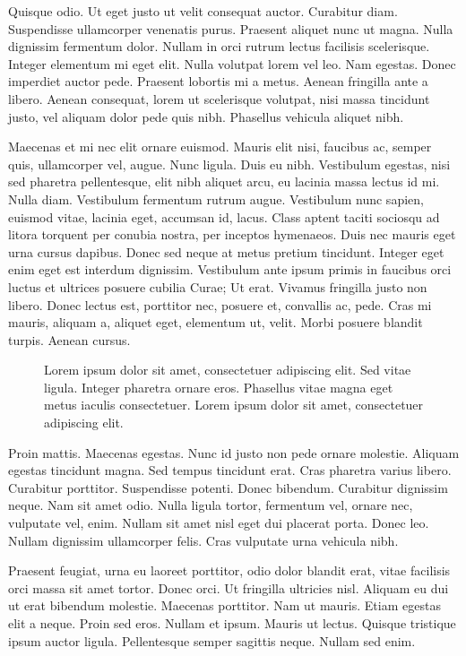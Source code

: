 \documentclass[nochapterpage,bigchapter,linedtoc,longdoc,colorback,accentcolor=tud3a]{tudreport}
\begin{document}
    Quisque odio. Ut eget justo ut velit consequat auctor. Curabitur diam. Suspendisse ullamcorper venenatis purus. Praesent aliquet nunc ut magna. Nulla dignissim fermentum dolor. Nullam in orci rutrum lectus facilisis scelerisque. Integer elementum mi eget elit. Nulla volutpat lorem vel leo. Nam egestas. Donec imperdiet auctor pede. Praesent lobortis mi a metus. Aenean fringilla ante a libero. Aenean consequat, lorem ut scelerisque volutpat, nisi massa tincidunt justo, vel aliquam dolor pede quis nibh. Phasellus vehicula aliquet nibh.

    Maecenas et mi nec elit ornare euismod. Mauris elit nisi, faucibus ac, semper quis, ullamcorper vel, augue. Nunc ligula. Duis eu nibh. Vestibulum egestas, nisi sed pharetra pellentesque, elit nibh aliquet arcu, eu lacinia massa lectus id mi. Nulla diam. Vestibulum fermentum rutrum augue. Vestibulum nunc sapien, euismod vitae, lacinia eget, accumsan id, lacus. Class aptent taciti sociosqu ad litora torquent per conubia nostra, per inceptos hymenaeos. Duis nec mauris eget urna cursus dapibus. Donec sed neque at metus pretium tincidunt. Integer eget enim eget est interdum dignissim. Vestibulum ante ipsum primis in faucibus orci luctus et ultrices posuere cubilia Curae; Ut erat. Vivamus fringilla justo non libero. Donec lectus est, porttitor nec, posuere et, convallis ac, pede. Cras mi mauris, aliquam a, aliquet eget, elementum ut, velit. Morbi posuere blandit turpis. Aenean cursus.
             \begin{figure}
                 \centering
                 \caption[Lorem ipsum dolor sit amet]{Lorem ipsum dolor sit amet, consectetuer adipiscing elit. Sed vitae ligula. Integer pharetra ornare eros. Phasellus vitae magna eget metus iaculis consectetuer. Lorem ipsum dolor sit amet, consectetuer adipiscing elit.}
             \end{figure}

    Proin mattis. Maecenas egestas. Nunc id justo non pede ornare molestie. Aliquam egestas tincidunt magna. Sed tempus tincidunt erat. Cras pharetra varius libero. Curabitur porttitor. Suspendisse potenti. Donec bibendum. Curabitur dignissim neque. Nam sit amet odio. Nulla ligula tortor, fermentum vel, ornare nec, vulputate vel, enim. Nullam sit amet nisl eget dui placerat porta. Donec leo. Nullam dignissim ullamcorper felis. Cras vulputate urna vehicula nibh.

    Praesent feugiat, urna eu laoreet porttitor, odio dolor blandit erat, vitae facilisis orci massa sit amet tortor. Donec orci. Ut fringilla ultricies nisl. Aliquam eu dui ut erat bibendum molestie. Maecenas porttitor. Nam ut mauris. Etiam egestas elit a neque. Proin sed eros. Nullam et ipsum. Mauris ut lectus. Quisque tristique ipsum auctor ligula. Pellentesque semper sagittis neque. Nullam sed enim.
\end{document}

